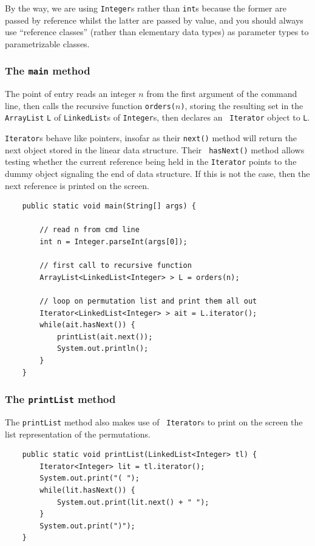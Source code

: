 \documentclass[a4paper]{book}
\theoremstyle{changebreak}                %
\begin{document}
By the way, we are using {\tt Integer}s rather
than {\tt int}s because the former are passed by
reference whilst
the latter are passed by value, and you should always use ``reference
classes'' (rather than elementary data
types) as parameter types
to parametrizable classes.

\subsubsection{The {\tt main} method}
The point of entry reads an integer $n$ from the
first argument of the command line, then calls the recursive function
{\tt orders($n$)}, storing the resulting set in the {\tt ArrayList}
{\tt L} of {\tt LinkedList}s of {\tt Integer}s, then declares an {\tt
  Iterator} object to {\tt L}. 

{\tt Iterator}s behave like pointers, insofar as their
{\tt next()} method
will return the next object stored in the linear data
structure. Their {\tt
  hasNext()} method
allows testing whether the current reference being
held in the {\tt Iterator} points to the dummy object
signaling the end of data structure. If this is
not the case, then the next reference is printed
on the screen.
\begin{verbatim}
    public static void main(String[] args) {
        
        // read n from cmd line
        int n = Integer.parseInt(args[0]);

        // first call to recursive function
        ArrayList<LinkedList<Integer> > L = orders(n);

        // loop on permutation list and print them all out
        Iterator<LinkedList<Integer> > ait = L.iterator();
        while(ait.hasNext()) {
            printList(ait.next());
            System.out.println();
        }
    }
\end{verbatim}

\subsubsection{The {\tt printList} method}
The {\tt printList} method also makes use of {\tt
  Iterator}s to print on the screen the list
representation of the permutations.
\begin{verbatim}
    public static void printList(LinkedList<Integer> tl) {
        Iterator<Integer> lit = tl.iterator();
        System.out.print("( ");
        while(lit.hasNext()) {
            System.out.print(lit.next() + " ");
        }
        System.out.print(")");
    }
\end{verbatim}
\end{document}
